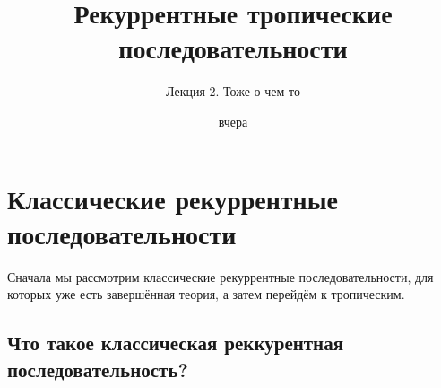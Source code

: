 \documentclass[russian]{lecture-notes}
\title{Рекуррентные тропические последовательности}
\date{вчера}
\subtitle{Лекция 2. Тоже о чем-то}
\begin{document}

\maketitle
{}
\section{Классические рекуррентные последовательности}

 Сначала мы рассмотрим классические рекуррентные последовательности, для которых уже есть завершённая теория, а затем перейдём к тропическим.
\subsection{Что такое классическая реккурентная последовательность?}
\end{document}
